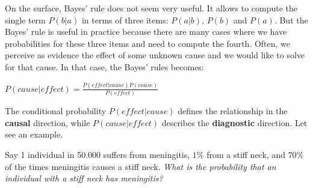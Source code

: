 On the surface, Bayes' rule does not seem very useful. It allows to compute the single term $P(b|a)$ in terms of three items: $P(a|b)$, $P(b)$ and $P(a)$. 
But the Bayes' rule is useful in practice because there are many cases where we have probabilities for these three items and need to compute the fourth.
Often, we perceive as evidence the effect of some unknown cause and we would like to solve for that cause. In that case, the Bayes' rules becomes:
\begin{center}
    $P(cause|effect) = \frac{P(effect|cause)P(cause)}{P(effect)}$ 
\end{center}
The conditional probability $P(effect|cause)$ defines the relationship in the \textbf{causal} direction, while $P(cause|effect)$ describes the \textbf{diagnostic} direction. Let see an example.
\begin{example}
    Say 1 individual in 50.000 suffers from meningitis, $1\%$ from a stiff neck, and $70\%$ of the times meningitis causes a stiff neck. \textit{What is the probability that an individual with a stiff neck has meningitis?}
\end{example}